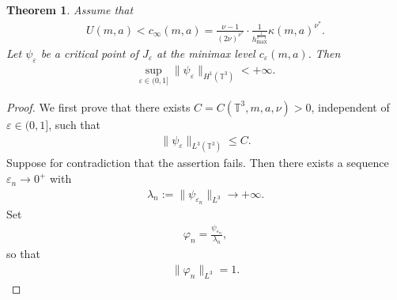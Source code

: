 \documentclass[10pt,a4paper]{amsart}
\newtheorem{thm}{Theorem}
\newcommand{\T}{\mathbb{T}}
\newcommand{\eps}{\varepsilon}
\begin{document}
\begin{thm}
\label{thm:Soler-subthreshold}
Assume that
\begin{align}
U(m,a)<c_\infty(m,a)=\frac{\nu-1}{(2\nu)^{\nu^*}}\cdot\frac{1}{h_{\max}^{\frac{1}{\nu-1}}}\kappa(m,a)^{\nu^*}.
\end{align}
Let $\psi_\eps$ be a critical point of $J_\eps$ at the
minimax level $c_\eps(m,a)$. Then
\begin{align}
\sup_{\eps\in(0,1]}
\|\psi_\eps\|_{H^1(\T^3)}<+\infty.
\end{align}
\end{thm}

\begin{proof}
We first prove that there exists $C=C(\mathbb{T}^3,m,a,\nu)>0$, independent of $\eps\in(0,1]$, such that
\begin{align}
\|\psi_\eps\|_{L^3(\T^3)}\leq C.
\end{align}
Suppose for contradiction that the assertion fails. Then there exists a sequence $\eps_n\to0^+$ with
\begin{align}
\lambda_n :=
\|\psi_{\eps_n}\|_{L^3}
\to+\infty.
\end{align}
Set
\begin{align}
\varphi_n=\frac{\psi_{\eps_n}}{\lambda_n},
\end{align}
so that
\begin{align}
\|\varphi_n\|_{L^3}=1.
\end{align}



\end{proof}
\end{document}
